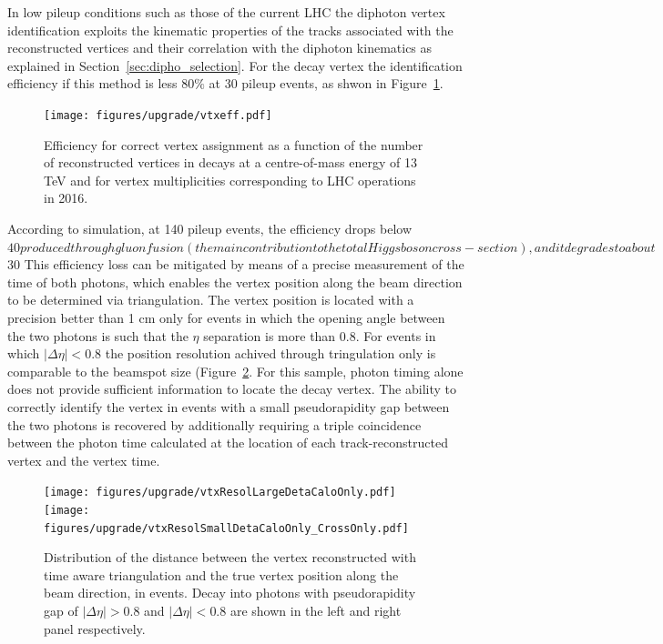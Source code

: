 In low pileup conditions such as those of the current LHC the diphoton vertex identification exploits
the kinematic properties of the tracks associated with the reconstructed vertices and their correlation with the diphoton
kinematics as explained in Section~\ref{sec:dipho_selection}.
For the \Hgg decay vertex the identification efficiency if this method is less $80\%$ at 30 pileup events,
as shwon in Figure~\ref{fig:hgg_vtx_run2}.

\begin{figure}[h!]
  \centering
  \texttt{[image: figures/upgrade/vtxeff.pdf]}
  \caption{Efficiency for correct vertex assignment as a function of the number of reconstructed
    vertices in \Hgg decays at a centre-of-mass energy of 13 TeV and for vertex multiplicities
    corresponding to LHC operations in 2016.}
  \label{fig:hgg_vtx_run2}
\end{figure}

According to simulation, at 140 pileup events, the efficiency drops below $40%
produced through gluon fusion (the main contribution to the total Higgs boson cross-section),
and it degrades to about $30%
This efficiency loss can be mitigated by means of a precise measurement of the time of both photons,
which enables the vertex position along the beam direction to be determined via triangulation.
The vertex position
is located with a precision better than 1 cm only for events in which the opening angle between the two
photons is such that the $\eta$ separation is more than 0.8. For events in which $|\Delta\eta|<0.8$ the position
resolution achived through tringulation only is comparable to the beamspot size (Figure~\ref{fig:dipho_deta}.
For this sample, photon timing alone does not provide sufficient information to locate the \Hgg
decay vertex.
The ability to correctly identify the vertex in events with a small pseudorapidity gap between
the two photons is recovered by additionally requiring a triple coincidence between the photon
time calculated at the location of each track-reconstructed vertex and the vertex time.

\begin{figure}[h!]
  \centering
  \texttt{[image: figures/upgrade/vtxResolLargeDetaCaloOnly.pdf]}
  \texttt{[image: figures/upgrade/vtxResolSmallDetaCaloOnly\_CrossOnly.pdf]}
  \caption{Distribution of the distance between the vertex reconstructed with time aware
    triangulation and the true vertex position along the beam direction, in \Hgg events.
    Decay into photons with pseudorapidity gap of $|\Delta\eta| > 0.8$ and
    $|\Delta\eta| < 0.8$ are shown in the left and right panel
    respectively.}
  \label{fig:dipho_deta}
\end{figure}

